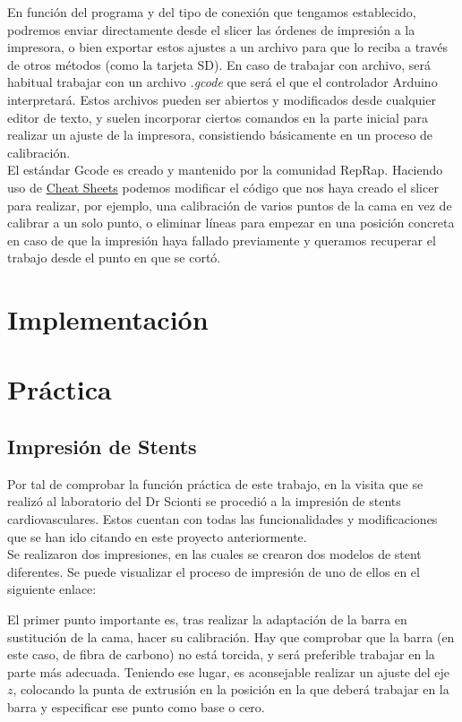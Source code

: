 \documentclass[a4paper,12pt]{article}
\begin{document}
En función del programa y del tipo de conexión que tengamos establecido, podremos enviar directamente desde el slicer las órdenes de impresión a la impresora, o bien exportar estos ajustes a un archivo para que lo reciba a través de otros métodos (como la tarjeta SD). En caso de trabajar con archivo, será habitual trabajar con un archivo \emph{.gcode} que será el que el controlador Arduino interpretará. Estos archivos pueden ser abiertos y modificados desde cualquier editor de texto, y suelen incorporar ciertos comandos en la parte inicial para realizar un ajuste de la impresora, consistiendo básicamente en un proceso de calibración.\\

El estándar Gcode es creado y mantenido por la comunidad RepRap. Haciendo uso de \href{https://thingiverse-production-new.s3.amazonaws.com/assets/87/b0/2c/f5/4c/CheatSheet.pdf}{Cheat Sheets} podemos modificar el código que nos haya creado el slicer para realizar, por ejemplo, una calibración de varios puntos de la cama en vez de calibrar a un solo punto, o eliminar líneas para empezar en una posición concreta en caso de que la impresión haya fallado previamente y queramos recuperar el trabajo desde el punto en que se cortó. 



\pagebreak
\section{Implementación}


\pagebreak
\section{Práctica}
\subsection{Impresión de Stents}
Por tal de comprobar la función práctica de este trabajo, en la visita que se realizó al laboratorio del Dr Scionti se procedió a la impresión de stents cardiovasculares. Estos cuentan con todas las funcionalidades y modificaciones que se han ido citando en este proyecto anteriormente.\\

Se realizaron dos impresiones, en las cuales se crearon dos modelos de stent diferentes. Se puede visualizar el proceso de impresión de uno de ellos en el siguiente enlace: %

El primer punto importante es, tras realizar la adaptación de la barra en sustitución de la cama, hacer su calibración. Hay que comprobar que la barra (en este caso, de fibra de carbono) no está torcida, y será preferible trabajar en la parte más adecuada. Teniendo ese lugar, es aconsejable realizar un ajuste del eje $z$, colocando la punta de extrusión en la posición en la que deberá trabajar en la barra y especificar ese punto como base o cero.\\
\end{document}
